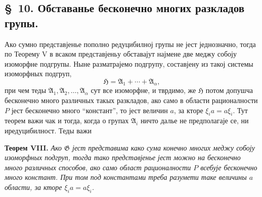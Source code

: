 ﻿\documentclass[11pt]{article}
\begin{document}

\setcounter{footnote}{19}
\subsection*{\S~10. Обставанье бесконечно многих разкладов групы.}

Ако сумно представјенье пополно редуцибилној групы не јест једнозначно, тогда по Теорему V в всаком представјеньу обставајут најмене две меджу собоју изоморфне подгрупы. Ныне разматрајемо подгрупу, составјену из такој системы изоморфных подгруп,
\[
  \mathfrak H=\mathfrak A_1+\cdots+\mathfrak A_\alpha,
\]
при чем теды \(\mathfrak A_1,\mathfrak A_2,\ldots,\mathfrak A_\alpha\) сут все изоморфне, и тврдимо, же \(\mathfrak H\) потом допушча бесконечно много различных такых разкладов, ако само в области рационалности \(P\) јест бесконечно много ``констант'', то јест величин \(a\), за кторе \(\xi_i a=a\xi_i\). Тут теорем важи чак и тогда, когда о групах \(\mathfrak A_i\) ничто далье не предполагаје се, ни иредуцибилност. Теды важи

\textbf{Теорем VIII.} \textit{Ако \(\mathfrak G\) јест представима како сума конечно многих меджу собоју изоморфных подгруп, тогда тако представјенье јест можно на бесконечно много различных способов, ако само област рационалности \(P\) всебује бесконечно много констант. При том под константами треба разумети таке величины \(a\) области, за кторе \(\xi_i a=a\xi_i\).}
\end{document}
